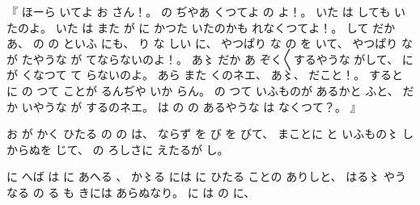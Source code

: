 %
『
ほーら
いてよ
お
さん！。
%
の
ぢやあ
くつてよ
の
よ！。
%
いた
は
しても
いたのよ。
%
いた
は
また
が
に
かつた
いたのかも
れなくつてよ！。
%
して
だか
あ、
%
の
の
といふ
にも、
%
り
な
しい
に、
%
やつぱり
な
の
を
いて、
%
やつぱり
な
が%
たやうな
が
てならないのよ！。
%
あ〻%
だか
あ
ぞく〳〵するやうな
がして、%
%
に
が
くなつて
て
らないのよ。
%
あら
また
くのネエ、
%
あ〻、%
%
だこと！。
%
すると
に
の
つて
ことが
るんぢや
いか
らん。
%
の
つて
いふものが
あるかと
ふと、
%
だか
いやうな
が
するのネエ。
%
は
の
の
あるやうな
は%
なくつて？。
』

%
お
が
かく
ひたる
の
の
は、
%
ならず
を
び
を
びて、
%
まことに
と
いふもの〻%
しからぬを
じて、
%
の
ろしさに
えたるが
し。

%
に
へば
は
に
あへる
、
%
か〻る%
には
に
ひたる
ことの
ありしと、
%
はる〻%
やうなる
の%
る
も
きには
あらぬなり。
%
に
は
の
に、

